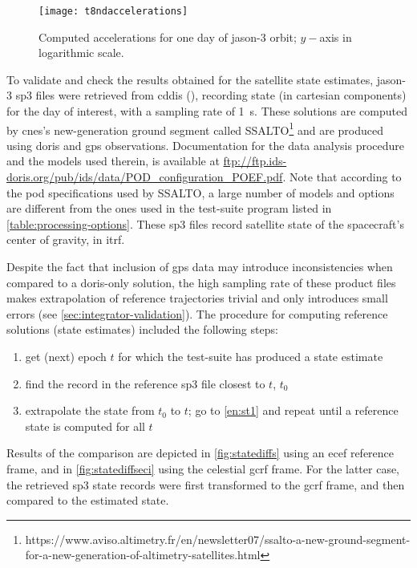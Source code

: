 \begin{figure}
    \centering
    \texttt{[image: t8ndaccelerations]}
    \caption{Computed accelerations for one day of \gls{jason}-3 orbit; $y-$axis in logarithmic scale.}
    \label{fig:accelerations}
\end{figure}

To validate and check the results obtained for the satellite state estimates, 
\gls{jason}-3 sp3 files were retrieved from \gls{cddis} (\cite{Noll2010}), recording 
state (in cartesian components) for the day of interest, with a sampling rate of 
\SI{1}{\second}. These solutions are computed by \gls{cnes}'s new-generation ground segment 
called SSALTO\footnote{https://www.aviso.altimetry.fr/en/newsletter07/ssalto-a-new-ground-segment-for-a-new-generation-of-altimetry-satellites.html} 
and are produced using \gls{doris} and \gls{gps} observations. Documentation 
for the data analysis procedure and the models used therein, is available at 
\url{ftp://ftp.ids-doris.org/pub/ids/data/POD_configuration_POEF.pdf}. Note that 
according to the \gls{pod} specifications used by SSALTO, a large number of models 
and options are different from the ones used in the test-suite program listed in 
\autoref{table:processing-options}. These sp3 files record satellite state of the 
spacecraft's center of gravity, in \gls{itrf}.

Despite the fact that inclusion of \gls{gps} data may introduce inconsistencies 
when compared to a \gls{doris}-only solution, the high sampling rate of these 
product files makes extrapolation of reference trajectories trivial and only introduces 
small errors (see \autoref{sec:integrator-validation}). The procedure for computing 
reference solutions (state estimates) included the following steps:
\begin{enumerate}
  \item \label{en:st1} get (next) epoch $t$ for which the test-suite has produced a state estimate
  \item find the record in the reference sp3 file closest to $t$, $t_0$
  \item extrapolate the state from $t_0$ to $t$; go to \autoref{en:st1} and repeat 
    until a reference state is computed for all $t$
\end{enumerate}

Results of the comparison are depicted in \autoref{fig:statediffs} using an \gls{ecef} 
reference frame, and in \autoref{fig:statediffseci} using the celestial \gls{gcrf} 
frame. For the latter case, the retrieved sp3 state records were first transformed to 
the \gls{gcrf} frame, and then compared to the estimated state.

